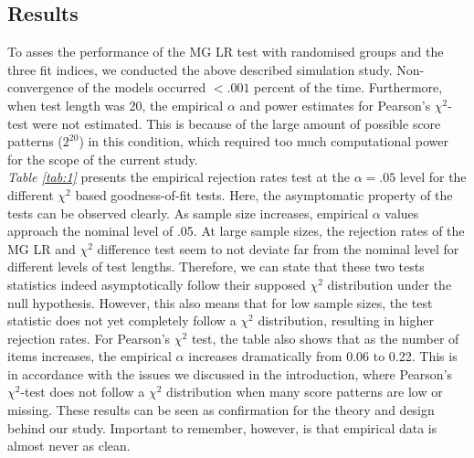 \documentclass[Royal,sageapa,times,doublespace]{sagej}
\begin{document}
\subsection{Results}

To asses the performance of the MG LR test with randomised groups and the three fit indices, we conducted the above described simulation study. Non-convergence of the models occurred $<.001$ percent of the time. Furthermore, when test length was 20, the empirical $\alpha$ and power estimates for Pearson's $\chi^2$-test were not estimated. This is because of the large amount of possible score patterns ($2^20$) in this condition, which required too much computational power for the scope of the current study. \\
\indent \textit{Table \ref{tab:1}} presents the empirical rejection rates test at the $\alpha = .05$ level for the different $\chi^2$ based goodness-of-fit tests. Here, the asymptomatic property of the tests can be observed clearly. As sample size increases, empirical $\alpha$ values approach the nominal level of .05. At large sample sizes, the rejection rates of the MG LR and $\chi^2$ difference test seem to not deviate far from the nominal level for different levels of test lengths. Therefore, we can state that these two tests statistics indeed asymptotically follow their supposed $\chi^2$ distribution under the null hypothesis. However, this also means that for low sample sizes, the test statistic does not yet completely follow a $\chi^2$ distribution, resulting in higher rejection rates. For Pearson's $\chi^2$ test, the table also shows that as the number of items increases, the empirical $\alpha$ increases dramatically from 0.06 to 0.22. This is in accordance with the issues we discussed in the introduction, where Pearson's $\chi^2$-test does not follow a $\chi^2$ distribution when many score patterns are low or missing. These results can be seen as confirmation for the theory and design behind our study. Important to remember, however, is that empirical data is almost never as clean.
\end{document}
